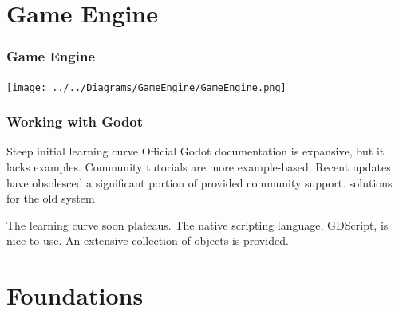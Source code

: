 \documentclass[ascpectratio=169]{beamer}
\begin{document}

\section{Game Engine}


\begin{frame}

  \frametitle{Game Engine}

  \begin{center}
    \texttt{[image: ../../Diagrams/GameEngine/GameEngine.png]}
  \end{center}

\end{frame}



\begin{frame}

  \frametitle{Working with Godot}

  \begin{outline}
    \1 Steep initial learning curve
    \1 Official Godot documentation is expansive, but it lacks examples.
    \1 Community tutorials are more example-based.
    \1 Recent updates have obsolesced a significant portion of provided
    community support.
      \2 solutions for the old system
  \end{outline}

  \vspace*{1cm}

  \begin{outline}
    \1 The learning curve soon plateaus.
    \1 The native scripting language, GDScript, is nice to use.
    \1 An extensive collection of objects is provided.
  \end{outline}

\end{frame}



\section{Foundations}

\end{document}
